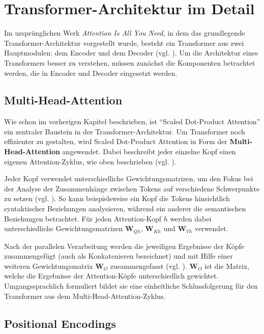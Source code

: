 \chapter{Transformer-Architektur im Detail}

Im ursprünglichen Werk \textit{Attention Is All You Need}, in dem das grundlegende Transformer-Architektur vorgestellt wurde, besteht ein Transformer aus zwei Hauptmodulen: dem Encoder und dem Decoder (vgl. \cite[S. 3]{attention}).
Um die Architektur eines Transformers besser zu verstehen, müssen zunächst die Komponenten betrachtet werden, die in Encoder und Decoder eingesetzt werden.

\section{Multi-Head-Attention}

Wie schon im vorherigen Kapitel beschrieben, ist \enquote{Scaled Dot-Product Attention} ein zentraler Baustein in der Transformer-Architektur.  
Um Transformer noch effizienter zu gestalten, wird Scaled Dot-Product Attention in Form der \textbf{Multi-Head-Attention} angewendet. 
Dabei beschreibt jeder einzelne Kopf einen eigenen Attention-Zyklus, wie oben beschrieben (vgl. \cite[S. 211]{paass.2020}).

Jeder Kopf verwendet unterschiedliche Gewichtungsmatrizen, um den Fokus bei der Analyse der Zusammenhänge zwischen Tokens auf verschiedene Schwerpunkte zu setzen (vgl. \cite[S. 5]{attention}).  
So kann beispielsweise ein Kopf die Tokens hinsichtlich syntaktischer Beziehungen analysieren, während ein anderer die semantischen Beziehungen betrachtet.  
Für jeden Attention-Kopf \( h \) werden dabei unterschiedliche Gewichtungsmatrizen \( \mathbf{W}_{Qh} \), \( \mathbf{W}_{Kh} \) und \( \mathbf{W}_{Vh} \) verwendet.

Nach der parallelen Verarbeitung werden die jeweiligen Ergebnisse der Köpfe zusammengefügt (auch als Konkatenieren bezeichnet) und mit Hilfe einer weiteren Gewichtungsmatrix \( \mathbf{W}_{O} \) zusammengefasst (vgl. \cite[S. 5]{attention}).  
\( \mathbf{W}_{O} \) ist die Matrix, welche die Ergebnisse der Attention-Köpfe unterschiedlich gewichtet.  
Umgangssprachlich formuliert bildet sie eine einheitliche Schlussfolgerung für den Transformer aus dem Multi-Head-Attention-Zyklus.

\section{Positional Encodings}

